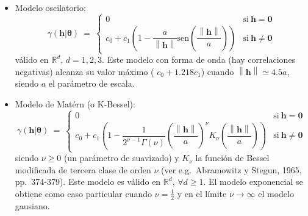 \documentclass[
]{book}
\theoremstyle{break}
\theoremstyle{definition}
\theoremstyle{definition}
\theoremstyle{definition}
\theoremstyle{definition}
\theoremstyle{remark}
\begin{document}
\begin{itemize}
\[\begin{array}{ll}
  0 & \text{si}\  \mathbf{h}=\mathbf{0} \\
  c_0 + c_1 \left( 1-\exp \left( -3\left( \dfrac{\left\|
  \mathbf{h}\right\| }{a} \right)^{\lambda } \right) \right)  & \text{si}\ 
  \mathbf{h}\neq \mathbf{0}
  \end{array}
  \right.\]
  con \(0\leq \lambda \leq 2\) y válido en \(\mathbb{R}^{d}\), \(\forall d \geq 1\).
  Cuando \(\lambda =2\) es denominado modelo gausiano;
  este modelo sin embargo no debería ser utilizado en la predicción
  espacial debido a las inestabilidades numéricas que produce en los
  algoritmos kriging (especialmente cuando el efecto nugget es grande; ver
  e.g.~Wackernagel, 1998, pp.~120-123).
  El modelo exponencial se obtiene también como caso particular cuando \(\lambda =1\).
\item
  Modelo oscilatorio:
  \[\gamma(\mathbf{h}\left| \boldsymbol{\theta}\right. )\ =\ \left\{ 
  \begin{array}{ll}
  0 & \text{si}\  \mathbf{h}=\mathbf{0} \\
  c_0 + c_1 \left( 1-\dfrac{a}{\left\| \mathbf{h}\right\| }
  \text{sen} \left( \dfrac{\left\| \mathbf{h}\right\| }{a} \right) \right) 
  & \text{si}\  \mathbf{h}\neq \mathbf{0}
  \end{array}
  \right.\]
  válido en \(\mathbb{R}^{d}\), \(d=1,2,3\).
  Este modelo con forma de onda (hay correlaciones negativas) alcanza su valor máximo ( \(c_0 +1.218c_1\)) cuando \(\left\| \mathbf{h}\right\| \simeq 4.5a\), siendo \(a\) el parámetro de escala.
\item
  Modelo de Matérn (o K-Bessel):
  \[\gamma(\mathbf{h}\left| \boldsymbol{\theta}\right. )\ =\ \left\{ 
  \begin{array}{ll}
  0 & \text{si}\  \mathbf{h}=\mathbf{0} \\
  c_0 + c_1 \left( 1-\dfrac{1}{2^{\nu -1} \Gamma(\nu )} \left(
  \dfrac{\left\| \mathbf{h}\right\| }{a} \right)^{\nu } K_{\nu } \left(
  \dfrac{\left\| \mathbf{h}\right\| }{a} \right) \right)  & \text{si}\ 
  \mathbf{h}\neq \mathbf{0}
  \end{array}
  \right.\]
  siendo \(\nu \geq 0\) (un parámetro de suavizado) y \(K_{\nu }\) la función de Bessel modificada de tercera clase de orden \(\nu\) (ver e.g.~Abramowitz y Stegun, 1965, pp.~374-379).
  Este modelo es válido en \(\mathbb{R}^{d}\), \(\forall d \geq 1\). El modelo exponencial se obtiene como caso particular cuando \(\nu =\frac{1}{2}\) y en el límite \(\nu \rightarrow \infty\) el modelo gausiano.
\end{itemize}
\end{document}

